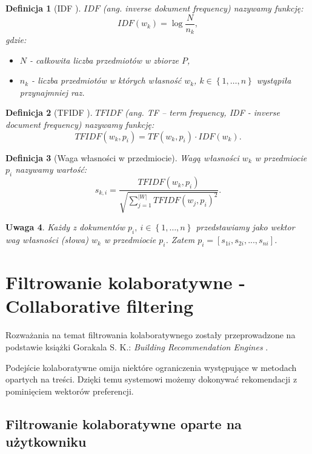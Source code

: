 \documentclass[12pt,a4paper]{report}
\newtheorem{df}{Definicja}[chapter]
\newtheorem{uwaga}[df]{Uwaga}
\newcommand{\set}[1]{\left\lbrace {#1} \right\rbrace}
\newcommand{\setPrzedmioty}{\mathit{P}}
\begin{document}
\begin{df}[IDF {\citep[Sec 3.3.1.1]{rsh}}]
$IDF$ (ang. \textit{inverse dokument frequency}) nazywamy funkcję:
$$
IDF(w_k) = \log \frac{N}{n_k},
$$
gdzie:
\begin{itemize}
\item $N$ - całkowita liczba przedmiotów w zbiorze $\setPrzedmioty$,
\item $n_k$ - liczba przedmiotów w których własność $w_k$, $k \in \set{1, \ldots, n}$ wystąpiła przynajmniej raz.
\end{itemize}
\end{df}

\begin{df}[TFIDF {\citep[Sec 3.3.1.1]{rsh}}]
$TFIDF$ (ang. \textit{TF – term frequency, IDF - inverse document frequency}) nazywamy funkcję:
$$
TFIDF(w_k, p_i) = TF(w_k, p_i) \cdot IDF(w_k).
$$
\end{df}

\begin{df}[Waga własności w przedmiocie]
Wagą własności $w_k$ w przedmiocie $p_i$ nazywamy wartość:
$$
s_{k,i} = \frac{TFIDF(w_k, p_i)}{\sqrt{ \sum_{j=1}^{|W|}{TFIDF(w_j, p_i)}^2}}.
$$
\end{df}

\begin{uwaga}
Każdy z dokumentów $p_i, \: i\in\set{1,\ldots,n} $ przedstawiamy jako wektor wag własności (słowa) $w_k$ w przedmiocie $p_i$. Zatem $ p_i = [s_{1i}, s_{2i},...,s_{ni}] $.
\end{uwaga}

\section{Filtrowanie kolaboratywne - Collaborative filtering}
Rozważania na temat filtrowania kolaboratywnego zostały przeprowadzone na podstawie książki Gorakala S. K.: \textit{Building Recommendation Engines} {\citep[Sec 3]{bre}}.
\bigskip

Podejście kolaboratywne omija niektóre ograniczenia występujące w metodach opartych na treści. Dzięki temu systemowi możemy dokonywać rekomendacji z pominięciem wektorów preferencji. 

\subsection{Filtrowanie kolaboratywne oparte na użytkowniku}
\end{document}
